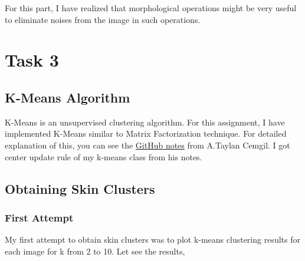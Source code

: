 \documentclass[11pt]{report}
\begin{document}
For this part, I have realized that morphological operations might be very useful to eliminate noises from the image in such operations.

\chapter{Task 3}

\section{K-Means Algorithm}

K-Means is an unsupervised clustering algorithm. For this assignment, I have implemented K-Means similar to Matrix Factorization technique. For detailed explanation of this, you can see the \href{https://github.com/atcemgil/notes/blob/master/Kmeans.ipynb}{GitHub notes} from A.Taylan Cemgil. I got center update rule of my k-means class from his notes.

\section{Obtaining Skin Clusters}

\subsection{First Attempt}

My first attempt to obtain skin clusters was to plot k-means clustering results for each image for k from 2 to 10. Let see the results,
\end{document}
